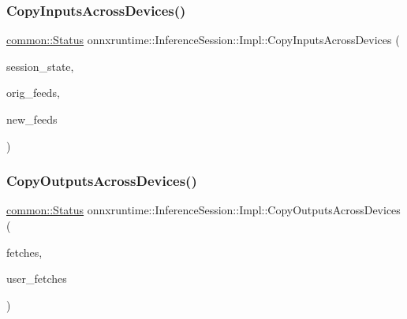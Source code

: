 \subsubsection{\texorpdfstring{Copy\+Inputs\+Across\+Devices()}{CopyInputsAcrossDevices()}}
{\footnotesize\ttfamily \mbox{\hyperlink{classonnxruntime_1_1common_1_1Status}{common\+::\+Status}} onnxruntime\+::\+Inference\+Session\+::\+Impl\+::\+Copy\+Inputs\+Across\+Devices (\begin{DoxyParamCaption}\item[{const \mbox{\hyperlink{classonnxruntime_1_1SessionState}{Session\+State}} \&}]{session\+\_\+state,  }\item[{const \mbox{\hyperlink{namespaceonnxruntime_a48b01f0410ec8d693dbd40d1132bd66c}{Name\+M\+L\+Val\+Map}} \&}]{orig\+\_\+feeds,  }\item[{\mbox{\hyperlink{namespaceonnxruntime_a48b01f0410ec8d693dbd40d1132bd66c}{Name\+M\+L\+Val\+Map}} \&}]{new\+\_\+feeds }\end{DoxyParamCaption})\hspace{0.3cm}{\ttfamily [inline]}}

\mbox{\label{classonnxruntime_1_1InferenceSession_1_1Impl_a186dd29be61d0703146263d87f1271f1}} 
\subsubsection{\texorpdfstring{Copy\+Outputs\+Across\+Devices()}{CopyOutputsAcrossDevices()}}
{\footnotesize\ttfamily \mbox{\hyperlink{classonnxruntime_1_1common_1_1Status}{common\+::\+Status}} onnxruntime\+::\+Inference\+Session\+::\+Impl\+::\+Copy\+Outputs\+Across\+Devices (\begin{DoxyParamCaption}\item[{std\+::vector$<$ \mbox{\hyperlink{classonnxruntime_1_1MLValue}{M\+L\+Value}} $>$ \&}]{fetches,  }\item[{std\+::vector$<$ \mbox{\hyperlink{classonnxruntime_1_1MLValue}{M\+L\+Value}} $>$ \&}]{user\+\_\+fetches }\end{DoxyParamCaption})\hspace{0.3cm}{\ttfamily [inline]}}

